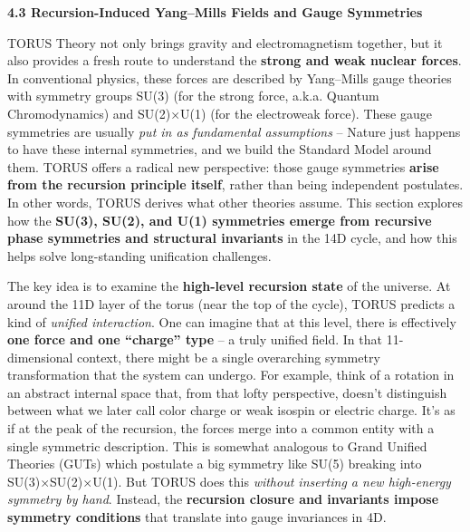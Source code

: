 \documentclass[
]{article}
\begin{document}
{\textbf{4.3 Recursion-Induced Yang--Mills Fields and Gauge Symmetries}

TORUS Theory not only brings gravity and electromagnetism together, but
it also provides a fresh route to understand the \textbf{strong and weak
nuclear forces}. In conventional physics, these forces are described by
Yang--Mills gauge theories with symmetry groups SU(3) (for the strong
force, a.k.a. Quantum Chromodynamics) and SU(2)×U(1) (for the
electroweak force). These gauge symmetries are usually \emph{put in as
fundamental assumptions} -- Nature just happens to have these internal
symmetries, and we build the Standard Model around them. TORUS offers a
radical new perspective: those gauge symmetries \textbf{arise from the
recursion principle itself}, rather than being independent postulates.
In other words, TORUS derives what other theories assume. This section
explores how the \textbf{SU(3), SU(2), and U(1) symmetries emerge from
recursive phase symmetries and structural invariants} in the 14D cycle,
and how this helps solve long-standing unification challenges.

The key idea is to examine the \textbf{high-level recursion state} of
the universe. At around the 11D layer of the torus (near the top of the
cycle), TORUS predicts a kind of \emph{unified interaction}. One can
imagine that at this level, there is effectively \textbf{one force and
one ``charge'' type} -- a truly unified field. In that 11-dimensional
context, there might be a single overarching symmetry transformation
that the system can undergo. For example, think of a rotation in an
abstract internal space that, from that lofty perspective, doesn't
distinguish between what we later call color charge or weak isospin or
electric charge\hspace{0pt}. It's as if at the peak of the recursion,
the forces merge into a common entity with a single symmetric
description. This is somewhat analogous to Grand Unified Theories (GUTs)
which postulate a big symmetry like SU(5) breaking into
SU(3)×SU(2)×U(1). But TORUS does this \emph{without inserting a new
high-energy symmetry by hand}. Instead, the \textbf{recursion closure
and invariants impose symmetry conditions} that translate into gauge
invariances in 4D\hspace{0pt}.

}
\end{document}
